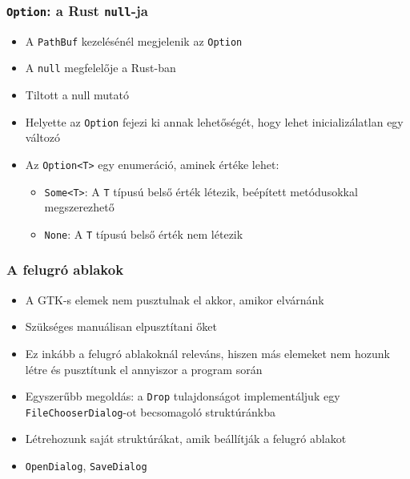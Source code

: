 \documentclass{beamer}
\begin{document}
    \begin{frame}[fragile]
        \frametitle{\texttt{Option}: a Rust \texttt{null}-ja}

        \begin{itemize}
            \item A \texttt{PathBuf} kezelésénél megjelenik az \texttt{Option}
            \item A \texttt{null} megfelelője a Rust-ban
            \item Tiltott a null mutató
            \item Helyette az \texttt{Option} fejezi ki annak lehetőségét, hogy lehet inicializálatlan egy változó  
            \item Az \texttt{Option<T>} egy enumeráció, aminek értéke lehet: \begin{itemize}
                \item \texttt{Some<T>}: A \texttt{T} típusú belső érték létezik, beépített metódusokkal megszerezhető
                \item \texttt{None}: A \texttt{T} típusú belső érték nem létezik
            \end{itemize}
        \end{itemize}
    \end{frame}

    \begin{frame}[fragile]
        \frametitle{A felugró ablakok}

        \begin{itemize}
            \item A GTK-s elemek nem pusztulnak el akkor, amikor elvárnánk
            \item Szükséges manuálisan elpusztítani őket
            \item Ez inkább a felugró ablakoknál releváns, hiszen más elemeket nem hozunk létre és pusztítunk el annyiszor a program során
            \item Egyszerűbb megoldás: a \texttt{Drop} tulajdonságot implementáljuk egy \texttt{FileChooserDialog}-ot becsomagoló struktúránkba
            \item Létrehozunk saját struktúrákat, amik beállítják a felugró ablakot
            \item \texttt{OpenDialog}, \texttt{SaveDialog}
        \end{itemize}
    \end{frame}
\end{document}
